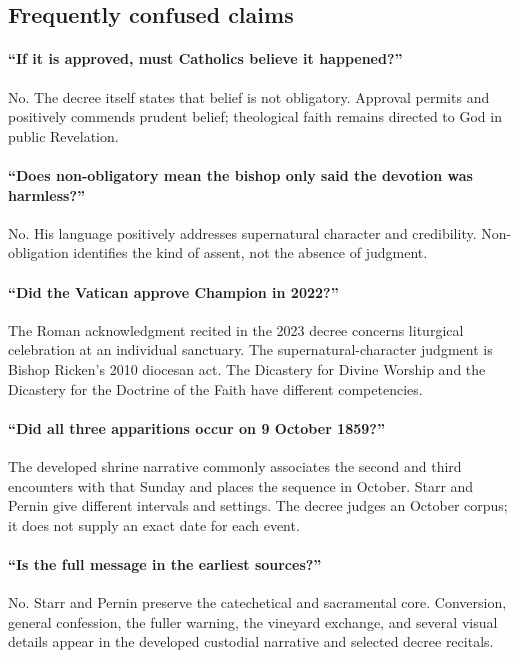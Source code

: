 \subsection{Frequently confused claims}

\paragraph{“If it is approved, must Catholics believe it happened?”}
No. The decree itself states that belief is not obligatory. Approval permits and positively commends prudent belief; theological faith remains directed to God in public Revelation.

\paragraph{“Does non-obligatory mean the bishop only said the devotion was harmless?”}
No. His language positively addresses supernatural character and credibility. Non-obligation identifies the kind of assent, not the absence of judgment.

\paragraph{“Did the Vatican approve Champion in 2022?”}
The Roman acknowledgment recited in the 2023 decree concerns liturgical celebration at an individual sanctuary. The supernatural-character judgment is Bishop Ricken's 2010 diocesan act. The Dicastery for Divine Worship and the Dicastery for the Doctrine of the Faith have different competencies.

\paragraph{“Did all three apparitions occur on 9 October 1859?”}
The developed shrine narrative commonly associates the second and third encounters with that Sunday and places the sequence in October. Starr and Pernin give different intervals and settings. The decree judges an October corpus; it does not supply an exact date for each event.

\paragraph{“Is the full message in the earliest sources?”}
No. Starr and Pernin preserve the catechetical and sacramental core. Conversion, general confession, the fuller warning, the vineyard exchange, and several visual details appear in the developed custodial narrative and selected decree recitals.

